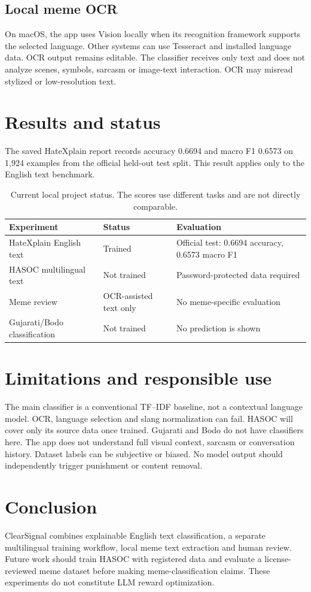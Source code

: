 \documentclass[11pt]{article}
\begin{document}
\subsection{Local meme OCR}
On macOS, the app uses Vision locally when its recognition framework supports the selected language. Other systems can use Tesseract and installed language data. OCR output remains editable. The classifier receives only text and does not analyze scenes, symbols, sarcasm or image-text interaction. OCR may misread stylized or low-resolution text.

\section{Results and status}
The saved HateXplain report records accuracy 0.6694 and macro F1 0.6573 on 1,924 examples from the official held-out test split. This result applies only to the English text benchmark.

\begin{table}[t]
\centering
\small
\begin{tabular}{l l l}
\toprule
Experiment & Status & Evaluation \\
\midrule
HateXplain English text & Trained & Official test: 0.6694 accuracy, 0.6573 macro F1 \\
HASOC multilingual text & Not trained & Password-protected data required \\
Meme review & OCR-assisted text only & No meme-specific evaluation \\
Gujarati/Bodo classification & Not trained & No prediction is shown \\
\bottomrule
\end{tabular}
\caption{Current local project status. The scores use different tasks and are not directly comparable.}
\label{tab:results}
\end{table}

\section{Limitations and responsible use}
The main classifier is a conventional TF--IDF baseline, not a contextual language model. OCR, language selection and slang normalization can fail. HASOC will cover only its source data once trained. Gujarati and Bodo do not have classifiers here. The app does not understand full visual context, sarcasm or conversation history. Dataset labels can be subjective or biased. No model output should independently trigger punishment or content removal.

\section{Conclusion}
ClearSignal combines explainable English text classification, a separate multilingual training workflow, local meme text extraction and human review. Future work should train HASOC with registered data and evaluate a license-reviewed meme dataset before making meme-classification claims. These experiments do not constitute LLM reward optimization.



\end{document}
